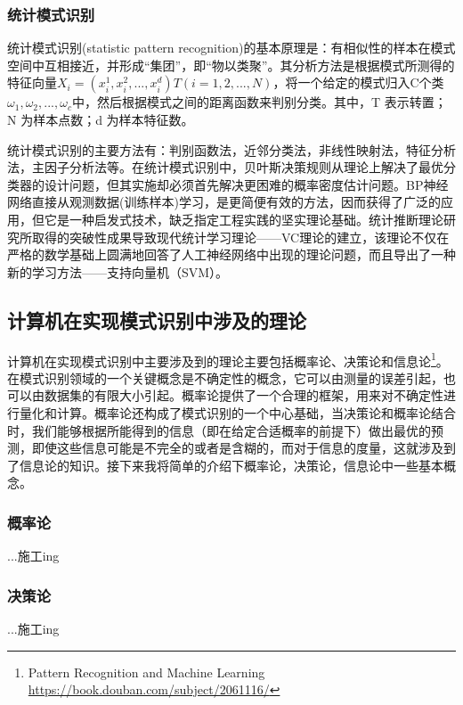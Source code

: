 \subsubsection{统计模式识别}

统计模式识别(statistic pattern recognition)的基本原理是：有相似性的样本在模式空间中互相接近，并形成“集团”，即“物以类聚”。其分析方法是根据模式所测得的特征向量$X_i=(x_i^1,x_i^2,...,x_i^d) T(i=1,2,...,N)$，将一个给定的模式归入C个类$\omega_1,\omega_2,...,\omega_c$中，然后根据模式之间的距离函数来判别分类。其中，T 表示转置；N 为样本点数；d 为样本特征数。

统计模式识别的主要方法有：判别函数法，近邻分类法，非线性映射法，特征分析法，主因子分析法等。在统计模式识别中，贝叶斯决策规则从理论上解决了最优分类器的设计问题，但其实施却必须首先解决更困难的概率密度估计问题。BP神经网络直接从观测数据(训练样本)学习，是更简便有效的方法，因而获得了广泛的应用，但它是一种启发式技术，缺乏指定工程实践的坚实理论基础。统计推断理论研究所取得的突破性成果导致现代统计学习理论——VC理论的建立，该理论不仅在严格的数学基础上圆满地回答了人工神经网络中出现的理论问题，而且导出了一种新的学习方法——支持向量机（SVM）。

\subsection{计算机在实现模式识别中涉及的理论}

计算机在实现模式识别中主要涉及到的理论主要包括概率论、决策论和信息论\footnote{Pattern Recognition and Machine Learning \quad \url{https://book.douban.com/subject/2061116/}}。 在模式识别领域的一个关键概念是不确定性的概念，它可以由测量的误差引起，也可以由数据集的有限大小引起。概率论提供了一个合理的框架，用来对不确定性进行量化和计算。概率论还构成了模式识别的一个中心基础，当决策论和概率论结合时，我们能够根据所能得到的信息（即在给定合适概率的前提下）做出最优的预测，即使这些信息可能是不完全的或者是含糊的，而对于信息的度量，这就涉及到了信息论的知识。接下来我将简单的介绍下概率论，决策论，信息论中一些基本概念。

\subsubsection{概率论}

...施工ing

\subsubsection{决策论}

...施工ing

